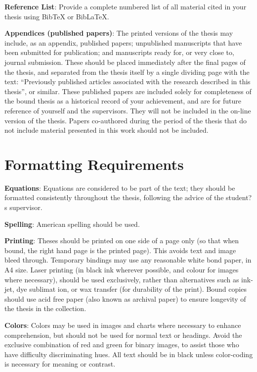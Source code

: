 \textbf{Reference List}:  Provide a complete numbered list of all material cited in your thesis using BibTeX or BibLaTeX.

\textbf{Appendices (published papers)}: The printed versions of the thesis may include, as an appendix, published papers; unpublished manuscripts that have been submitted for publication; and manuscripts ready for, or very close to, journal submission.  These should be placed immediately after the final pages of the thesis, and separated from the thesis itself by a single dividing page with the text: ``Previously published articles associated with the research described in this thesis'', or similar. These published papers are included solely for completeness of the bound thesis as a historical record of your achievement, and are for future reference of yourself and the supervisors.  They will not be included in the on-line version of the thesis. Papers co-authored during the period of the thesis that do not include material presented in this work should not be included.

\section{Formatting Requirements}

\textbf{Equations}: Equations are considered to be part of the text; they should be formatted consistently throughout the thesis, following the advice of the student?s supervisor.  

\textbf{Spelling}: American spelling should be used.

\textbf{Printing}:  Theses should be printed on one side of a page only (so that when bound, the right hand page is the printed page).  This avoids text and image bleed through.  Temporary bindings may use any reasonable white bond paper, in A4 size.  Laser printing (in black ink wherever possible, and colour for images where necessary), should be used exclusively, rather than alternatives such as ink-jet, dye sublimat ion, or wax transfer (for durability of the print).  Bound copies should use acid free paper (also known as archival paper) to ensure longevity of the thesis in the collection.

\textbf{Colors}:  Colors may be used in images and charts where necessary to enhance comprehension, but should not be used for normal text or headings.  Avoid the exclusive combination of red and green for binary images, to assist those who have difficulty discriminating hues.  All text should be in black unless color-coding is necessary for meaning or contrast.

